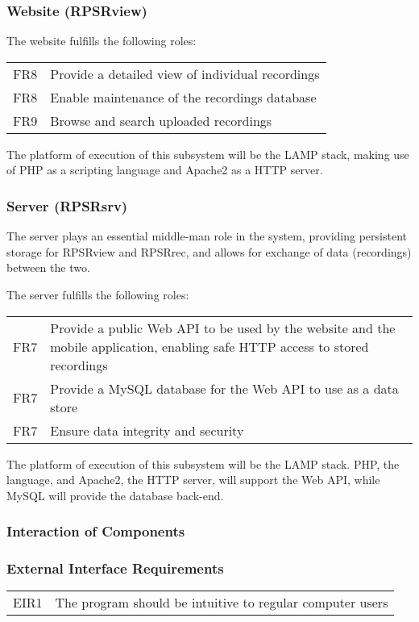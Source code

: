 \subsubsection{Website (RPSRview)}
    The website fulfills the following roles:\\    
    	\begin{tabular}{r | p{15cm}}
        	FR8 & Provide a detailed view of individual recordings \\
        	FR8 & Enable maintenance of the recordings database \\
    		FR9 & Browse and search uploaded recordings \\
        \end{tabular}
    The platform of execution of this subsystem will be the LAMP stack, making use of PHP as a scripting language and Apache2 as a HTTP server.
        
\subsubsection{Server (RPSRsrv)}
    The server plays an essential middle-man role in the system, providing persistent storage for RPSRview and RPSRrec,
    and allows for exchange of data (recordings) between the two. 

    The server fulfills the following roles:\\
    \begin{tabular}{r | p{15cm}}
        FR7 & Provide a public Web API to be used by the website and the mobile application, enabling safe HTTP access to stored recordings \\
        FR7 & Provide a MySQL database for the Web API to use as a data store \\
        FR7 & Ensure data integrity and security \\
	\end{tabular}
    The platform of execution of this subsystem will be the LAMP stack. PHP, the language, and Apache2, the HTTP server, will support the Web API, while MySQL will provide the database back-end.

\subsubsection{Interaction of Components}
	

\subsubsection{External Interface Requirements}
	\begin{tabular}{r | p{15cm}}
		EIR1 & The program should be intuitive to regular computer users \\
	\end{tabular}

